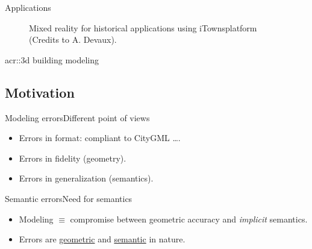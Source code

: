 \documentclass[10pt]{beamer}
\begin{document}
\begin{frame}{Applications}
{\begin{figure}[H]
                        \caption{Mixed reality for historical applications using iTowns\footnotemark platform (Credits to A. Devaux\footnotemark).}
                    \end{figure}
                    \addtocounter{footnote}{1}
                }
            \end{frame}

            \begin{frame}{\texorpdfstring{\acrshort*{acr::3d}}{3D} building modeling}
                \centering
                
            \end{frame}

        \subsection{Motivation}
            \begin{frame}{Modeling errors}{Different point of views}
                \begin{itemize}[label=$\blacktriangleright$, font=\color{IGNGreen}]
                    \item<1-> Errors in format: compliant to CityGML \dots.
                    \item<2-> Errors in fidelity (geometry).
                    \item<3-> Errors in generalization (semantics).
                \end{itemize}
            \end{frame}

            \begin{frame}{Semantic errors}{Need for semantics}
                \begin{itemize}[label=$\blacktriangleright$, font=\color{IGNGreen}]
                    \item<1-> Modeling \(\equiv\) compromise between geometric accuracy and \textit{implicit} semantics.
                    \item<2-> Errors are \underline{geometric} and \underline{semantic} in nature.
                \end{itemize}
            \end{frame}
        
\end{document}
